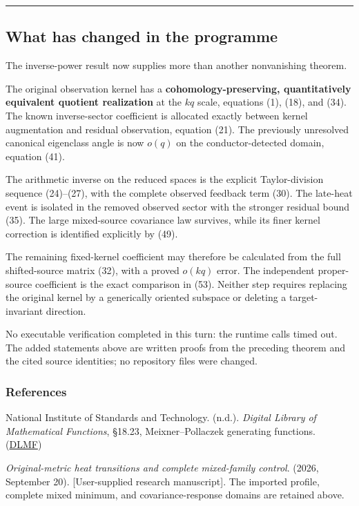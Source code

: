 \documentclass[11pt]{article}
\begin{document}
\begin{center}\rule{0.5\linewidth}{0.5pt}\end{center}

\subsection{What has changed in the programme}\label{what-has-changed-in-the-programme}

The inverse-power result now supplies more than another nonvanishing theorem.

The original observation kernel has a \textbf{cohomology-preserving, quantitatively equivalent quotient realization} at the \(kq\) scale, equations (1), (18), and (34). The known inverse-sector coefficient is allocated exactly between kernel augmentation and residual observation, equation (21). The previously unresolved canonical eigenclass angle is now \(o(q)\) on the conductor-detected domain, equation (41).

The arithmetic inverse on the reduced spaces is the explicit Taylor-division sequence (24)--(27), with the complete observed feedback term (30). The late-heat event is isolated in the removed observed sector with the stronger residual bound (35). The large mixed-source covariance law survives, while its finer kernel correction is identified explicitly by (49).

The remaining fixed-kernel coefficient may therefore be calculated from the full shifted-source matrix (32), with a proved \(o(kq)\) error. The independent proper-source coefficient is the exact comparison in (53). Neither step requires replacing the original kernel by a generically oriented subspace or deleting a target-invariant direction.

No executable verification completed in this turn: the runtime calls timed out. The added statements above are written proofs from the preceding theorem and the cited source identities; no repository files were changed.

\subsubsection{References}\label{references}

National Institute of Standards and Technology. (n.d.). \emph{Digital Library of Mathematical Functions}, §18.23, Meixner--Pollaczek generating functions. (\href{https://dlmf.nist.gov/18.23}{DLMF})

\emph{Original-metric heat transitions and complete mixed-family control}. (2026, September 20). {[}User-supplied research manuscript{]}. The imported profile, complete mixed minimum, and covariance-response domains are retained above.
\end{document}
